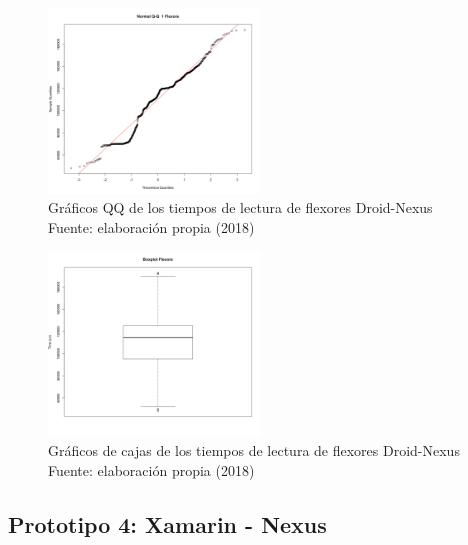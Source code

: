 \begin{figure}[H]
  \begin{center} 
   	\includegraphics[width=0.5\textwidth]{evaluation/graphics/Droid/Nexus/NormalQQFlexorsDroidNexus.png} 
   	\captionsetup{justification=centering}
    \caption[Gráfico QQ de los tiempos de lectura de flexores Droid-Nexus]{Gráficos QQ de los tiempos de lectura de flexores Droid-Nexus\\Fuente: elaboración propia (2018)} 
    \label{fig:droid-nexus-QQ-flexors}
  \end{center}
\end{figure}

\begin{figure}[H]
  \begin{center} 
   	\includegraphics[width=0.5\textwidth]{evaluation/graphics/Droid/Nexus/BoxplotFlexorsDroidNexus.png} 
   	\captionsetup{justification=centering}
    \caption[Gráficos de cajas de los tiempos de lectura de flexores Droid-Nexus]{Gráficos de cajas de los tiempos de lectura de flexores Droid-Nexus\\Fuente: elaboración propia (2018)} 
    \label{fig:droid-nexus-boxplot-flexors}
  \end{center}
\end{figure}

\subsection{Prototipo 4: Xamarin - Nexus}

